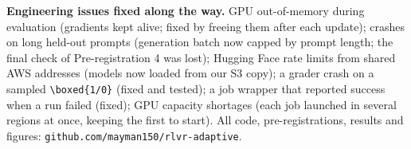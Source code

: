 \documentclass[11pt]{article}
\begin{document}
\textbf{Engineering issues fixed along the way.} GPU out-of-memory during evaluation (gradients kept alive; fixed by freeing them after each update); crashes on long held-out prompts (generation batch now capped by prompt length; the final check of Pre-registration 4 was lost); Hugging Face rate limits from shared AWS addresses (models now loaded from our S3 copy); a grader crash on a sampled \verb|\boxed{1/0}| (fixed and tested); a job wrapper that reported success when a run failed (fixed); GPU capacity shortages (each job launched in several regions at once, keeping the first to start). All code, pre-registrations, results and figures: \texttt{github.com/mayman150/rlvr-adaptive}.
\end{document}
